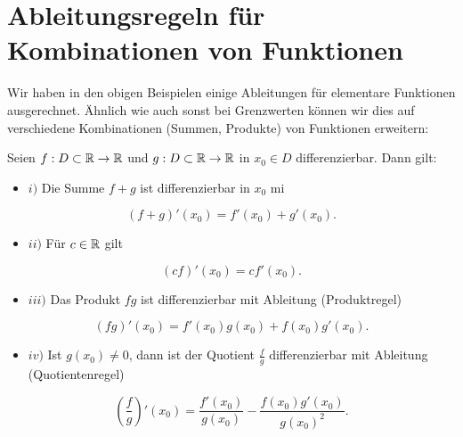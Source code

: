 \section{Ableitungsregeln für Kombinationen von Funktionen}
\label{\detokenize{differential/kombfkt:ableitungsregeln-fur-kombinationen-von-funktionen}}\label{\detokenize{differential/kombfkt::doc}}
Wir haben in den obigen Beispielen einige Ableitungen für elementare Funktionen ausgerechnet. Ähnlich wie auch sonst bei Grenzwerten können wir dies auf verschiedene Kombinationen (Summen, Produkte) von Funktionen erweitern:
\label{differential/kombfkt:theorem-0}
\begin{theorem}{}{}



Seien \(f: D\subset \mathbb{R} \rightarrow \mathbb{R}\) und \(g: D\subset \mathbb{R} \rightarrow \mathbb{R}\) in \(x_0 \in D\) differenzierbar. Dann gilt:
\begin{itemize}
\item {} 
\(i)\) Die Summe \(f+g\) ist differenzierbar in \(x_0\) mi

\end{itemize}
\begin{equation*}
 (f+g)'(x_0) = f'(x_0) + g'(x_0).
\end{equation*}\begin{itemize}
\item {} 
\(ii)\) Für \(c \in \mathbb{R}\) gilt

\end{itemize}
\begin{equation*}
 (cf)'(x_0) = c f'(x_0).
\end{equation*}\begin{itemize}
\item {} 
\(iii)\) Das Produkt \(fg\) ist differenzierbar mit Ableitung (Produktregel)

\end{itemize}
\begin{equation*}
 (fg)'(x_0) = f'(x_0) g(x_0) +  f(x_0) g'(x_0).
\end{equation*}\begin{itemize}
\item {} 
\(iv)\) Ist \(g(x_0) \neq 0\), dann ist der Quotient \(\frac{f}g\) differenzierbar mit Ableitung (Quotientenregel)

\end{itemize}
\begin{equation*}
 (\frac{f}g)'(x_0) = \frac{f'(x_0)}{ g(x_0)} -  \frac{f(x_0) g'(x_0)}{g(x_0)^2}.
\end{equation*}\end{theorem}

